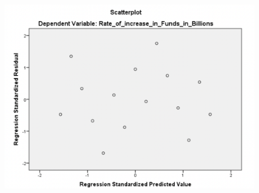 \documentclass[11pt, journal,letterpaper,compsoc]{IEEEtran}
\begin{document}
\begin{figure}  [h!]
\includegraphics[width=\linewidth]{images/scatterplot}
\end{figure}

\newpage
\end{document}
